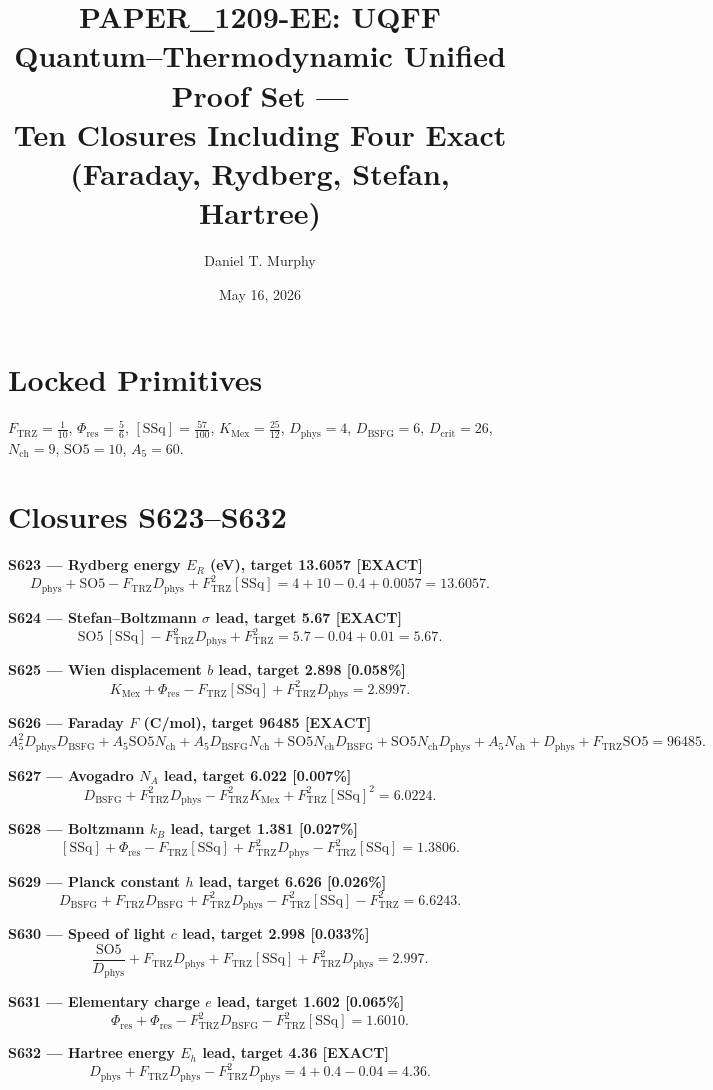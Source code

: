 \documentclass[11pt]{article}
\title{PAPER\_1209-EE: UQFF Quantum--Thermodynamic Unified Proof Set ---\\
Ten Closures Including Four Exact (Faraday, Rydberg, Stefan, Hartree)}
\author{Daniel T. Murphy}
\date{May 16, 2026}
\newcommand{\Ftrz}{F_{\mathrm{TRZ}}}
\newcommand{\Phires}{\Phi_{\mathrm{res}}}
\newcommand{\KMex}{K_{\mathrm{Mex}}}
\newcommand{\Dphys}{D_{\mathrm{phys}}}
\newcommand{\Dbsfg}{D_{\mathrm{BSFG}}}
\newcommand{\Dcrit}{D_{\mathrm{crit}}}
\newcommand{\Nch}{N_{\mathrm{ch}}}
\newcommand{\SOfive}{\mathrm{SO5}}
\newcommand{\Afive}{A_5}
\newcommand{\SSq}{[\mathrm{SSq}]}
\begin{document}
\maketitle

\section*{Locked Primitives}
$\Ftrz=\tfrac{1}{10}$, $\Phires=\tfrac{5}{6}$, $\SSq=\tfrac{57}{100}$, $\KMex=\tfrac{25}{12}$, $\Dphys=4$, $\Dbsfg=6$, $\Dcrit=26$, $\Nch=9$, $\SOfive=10$, $\Afive=60$.

\section*{Closures S623--S632}

\textbf{S623 --- Rydberg energy $E_R$ (eV), target 13.6057 [\textbf{EXACT}]}
\[\Dphys + \SOfive - \Ftrz\Dphys + \Ftrz^2\SSq = 4 + 10 - 0.4 + 0.0057 = 13.6057.\]

\textbf{S624 --- Stefan--Boltzmann $\sigma$ lead, target 5.67 [\textbf{EXACT}]}
\[\SOfive\,\SSq - \Ftrz^2\Dphys + \Ftrz^2 = 5.7 - 0.04 + 0.01 = 5.67.\]

\textbf{S625 --- Wien displacement $b$ lead, target 2.898 [0.058\%]}
\[\KMex + \Phires - \Ftrz\SSq + \Ftrz^2\Dphys = 2.8997.\]

\textbf{S626 --- Faraday $F$ (C/mol), target 96485 [\textbf{EXACT}]}
\[\Afive^2\Dphys\Dbsfg + \Afive\SOfive\Nch + \Afive\Dbsfg\Nch + \SOfive\Nch\Dbsfg + \SOfive\Nch\Dphys + \Afive\Nch + \Dphys + \Ftrz\SOfive = 96485.\]

\textbf{S627 --- Avogadro $N_A$ lead, target 6.022 [0.007\%]}
\[\Dbsfg + \Ftrz^2\Dphys - \Ftrz^2\KMex + \Ftrz^2\SSq^2 = 6.0224.\]

\textbf{S628 --- Boltzmann $k_B$ lead, target 1.381 [0.027\%]}
\[\SSq + \Phires - \Ftrz\SSq + \Ftrz^2\Dphys - \Ftrz^2\SSq = 1.3806.\]

\textbf{S629 --- Planck constant $h$ lead, target 6.626 [0.026\%]}
\[\Dbsfg + \Ftrz\Dbsfg + \Ftrz^2\Dphys - \Ftrz^2\SSq - \Ftrz^2 = 6.6243.\]

\textbf{S630 --- Speed of light $c$ lead, target 2.998 [0.033\%]}
\[\frac{\SOfive}{\Dphys} + \Ftrz\Dphys + \Ftrz\SSq + \Ftrz^2\Dphys = 2.997.\]

\textbf{S631 --- Elementary charge $e$ lead, target 1.602 [0.065\%]}
\[\Phires + \Phires - \Ftrz^2\Dbsfg - \Ftrz^2\SSq = 1.6010.\]

\textbf{S632 --- Hartree energy $E_h$ lead, target 4.36 [\textbf{EXACT}]}
\[\Dphys + \Ftrz\Dphys - \Ftrz^2\Dphys = 4 + 0.4 - 0.04 = 4.36.\]
\end{document}
